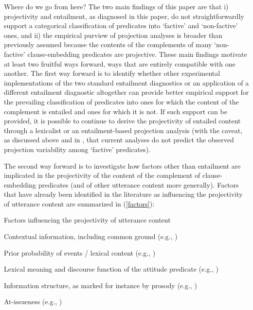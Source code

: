 \documentclass[11pt,fleqn]{article}
\newcommand{\6}{\mbox{$[\hspace*{-.6mm}[$}}
\newcommand{\9}{\mbox{$]\hspace*{-.6mm}]$}}
\begin{document}
{Where do we go from here? The two main findings of this paper are that i) projectivity and entailment, as diagnosed in this paper, do not straightforwardly support a categorical classification of predicates into `factive' and `non-factive' ones, and ii) the empirical purview of projection analyses is broader than previously assumed because the contents of the complements of many `non-factive' clause-embedding predicates are projective. These main findings motivate at least two fruitful ways forward, ways that are entirely compatible with one another. The first way forward is to identify whether other experimental implementations of the two standard entailment diagnostics or an application of a different entailment diagnostic altogether can provide better empirical support for the prevailing classification of predicates into ones for which the content of the complement is entailed and ones for which it is not. If such support can be provided, it is possible to continue to derive the projectivity of entailed content through a lexicalist or an entailment-based projection analysis (with the caveat, as discussed above and in \citealt{tbd-variability}, that current analyses do not predict the observed projection variability among `factive' predicates). 

The second way forward is to investigate how factors other than entailment are implicated in the projectivity of the content of the complement of clause-embedding predicates (and of other utterance content more generally). Factors that have already been identified in the literature as influencing the projectivity of utterance content are summarized in (\ref{factors}): 

\begin{exe}
\ex\label{factors} Factors influencing the projectivity of utterance content
\begin{xlist}

\ex Contextual information, including common ground (e.g., \citealt{gazdar79a,gazdar79b,tonhauser-etal-eval})

\ex Prior probability of events / lexical content (e.g., \citealt{tbd-variability})

\ex Lexical meaning and discourse function of the attitude predicate (e.g., \citealt{anand-hacquard2014,tbd-variability})

\ex Information structure, as marked for instance by prosody (e.g., \citealt{cummins-rohde2015,tonhauser-salt26,djaerv-bacovcin-salt27})

\ex At-issueness (e.g., \citealt{brst-salt10,best-question,abrusan2011,tbd-variability,mahler-nels})


\end{xlist}
\end{exe}}
\end{document}
